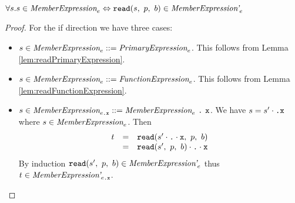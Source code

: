 \documentclass[preprint,10pt]{sigplanconf}
\begin{document}
\begin{lemma}\mbox{}

  \( \forall s. s \in \textit{MemberExpression}_{e} \Leftrightarrow 
  \texttt{read}(s,~p,~b) \in \textit{MemberExpression'}_{e} \)
\end{lemma}
\begin{proof}
  For the if direction we have three cases:
  \begin{itemize}
  \item \( s \in \textit{MemberExpression}_{e} ::=
    \textit{PrimaryExpression}_{e} \). This follows from Lemma
    \ref{lem:readPrimaryExpression}.
    
  \item \( s \in \textit{MemberExpression}_{e} ::=
    \textit{FunctionExpression}_{e} \). This follows from Lemma
    \ref{lem:readFunctionExpression}.
    
  \item \( s \in \textit{MemberExpression}_{e\texttt{.\texttt{x}}} ::=
    \textit{MemberExpression}_{e} ~\texttt{.}~\texttt{x} \). We have 
    \( s = s' \cdot \texttt{.} \texttt{x} \) where \( s \in
    \textit{MemberExpression}_{e} \). Then
    \[
    \begin{array}{rcl}
      t &=& \texttt{read}(s' \cdot \texttt{.} \cdot \texttt{x},~p,~b)
      \\
      &=& \texttt{read}(s',~p,~b) \cdot \texttt{.} \cdot \texttt{x}
    \end{array}
    \]
    By induction \( \texttt{read}(s',~p,~b) \in \textit{MemberExpression'}_{e}
    \) thus \( t \in \textit{MemberExpression'}_{e\texttt{.\texttt{x}}} \).
  \end{itemize}
\end{proof}
\end{document}
